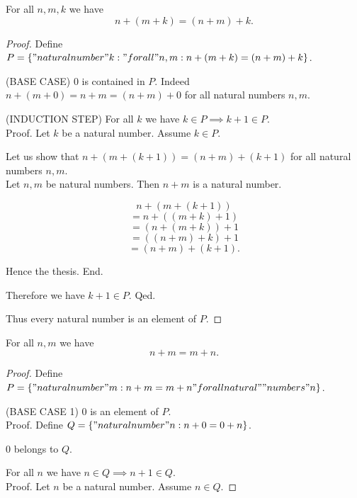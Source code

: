 \documentclass[../../natural-numbers.ftl.tex]{subfiles}
\begin{document}
  \begin{forthel}
    \begin{proposition}[NN 01 02 468785]
      For all $n,m,k$ we have
      $$n + (m + k) = (n + m) + k.$$
    \end{proposition}
    \begin{proof}
      Define $P = \{ "natural number" k : "for all" n,m: n + (m + k) = (n + m) + k \}$.

      (BASE CASE) $0$ is contained in $P$.
      Indeed $n + (m + 0) = n + m = (n + m) + 0$ for all natural numbers $n,m$.

      (INDUCTION STEP) For all $k$ we have $k \in P \implies k + 1 \in P$. \\
      Proof.
        Let $k$ be a natural number.
         Assume $k \in P$.

        Let us show that $n + (m + (k + 1)) = (n + m) + (k + 1)$ for all natural numbers $n,m$. \\
          Let $n,m$ be natural numbers.
          Then $n + m$ is a natural number.

          $$  n + (m + (k + 1))$$
          $$= n + ((m + k) + 1)$$  %
          $$= (n + (m + k)) + 1$$  %
          $$= ((n + m) + k) + 1$$  %
          $$= (n + m) + (k + 1).$$ %

          Hence the thesis.
        End.

        Therefore we have $k + 1 \in P$.
      Qed.

      Thus every natural number is an element of $P$.
    \end{proof}


    \begin{proposition}[NN 01 02 273100]
      For all $n,m$ we have
      $$n + m = m + n.$$
    \end{proposition}
    \begin{proof}
      Define $P = \{ "natural number" m : n + m = m + n "for all natural"\\"numbers" n \}$.

      (BASE CASE 1) $0$ is an element of $P$. \\
      Proof.
        Define $Q = \{ "natural number" n : n + 0 = 0 + n \}$.

        $0$ belongs to $Q$.

        For all $n$ we have $n \in Q \implies n + 1 \in Q$. \\
        Proof.
          Let $n$ be a natural number.
          Assume $n \in Q$.


\end{proof}
\end{forthel}
\end{document}
